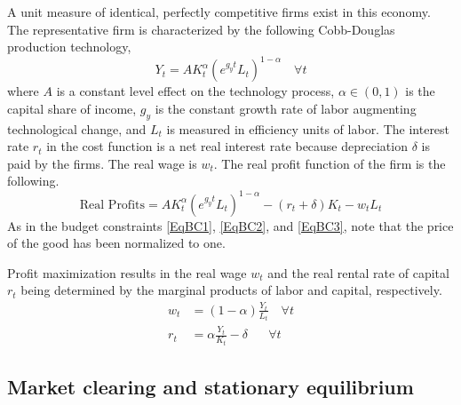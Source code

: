 \documentclass[letterpaper,12pt]{article}
\theoremstyle{definition}
\begin{document}
\begin{spacing}{1.5}
    A unit measure of identical, perfectly competitive firms exist in this economy. The representative firm is characterized by the following Cobb-Douglas production technology,
    \begin{equation}\label{EqCobbDougProd}
       Y_t = A K_t^\alpha\left(e^{g_y t}L_t\right)^{1-\alpha} \quad \forall t
    \end{equation}
    where $A$ is a constant level effect on the technology process, $\alpha\in(0,1)$ is the capital share of income, $g_y$ is the constant growth rate of labor augmenting technological change, and $L_t$ is measured in efficiency units of labor. The interest rate $r_t$ in the cost function is a net real interest rate because depreciation $\delta$ is paid by the firms. The real wage is $w_t$. The real profit function of the firm is the following.
    \begin{equation}\label{EqFirmProfit}
       \text{Real Profits} = A K_t^\alpha\left(e^{g_y t}L_t\right)^{1-\alpha} - (r_t + \delta)K_t - w_t L_t
    \end{equation}
    As in the budget constraints \eqref{EqBC1}, \eqref{EqBC2}, and \eqref{EqBC3}, note that the price of the good has been normalized to one.

    Profit maximization results in the real wage $w_t$ and the real rental rate of capital $r_t$ being determined by the marginal products of labor and capital, respectively.
    \begin{align}
       w_t &= (1-\alpha)\frac{Y_t}{L_t} \quad \forall t \label{EqFOCwage}\\
       r_t &= \alpha\frac{Y_t}{K_t} - \delta \quad\:\:\: \forall t \label{EqFOCrate}
    \end{align}


  \subsection{Market clearing and stationary equilibrium}\label{SecMCEqlbm}


\end{spacing}
\end{document}
